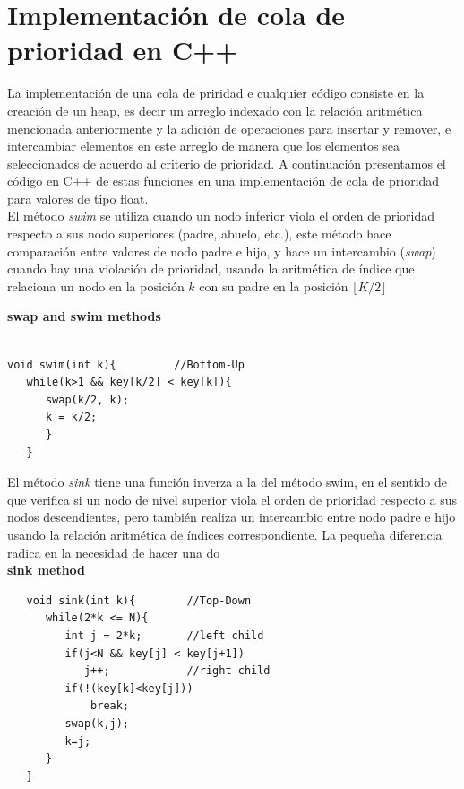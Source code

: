 \documentclass[letterpaper]{article}
\begin{document}
\section{Implementación de cola de prioridad en C++}

La implementación de una cola de priridad e cualquier código consiste en la creación de un heap, es decir un arreglo indexado con la relación aritmética mencionada anteriormente y la adición de operaciones para insertar y remover, e intercambiar elementos en este arreglo de manera que los elementos sea seleccionados de acuerdo al criterio de prioridad. A continuación presentamos el código en C++ de estas funciones en una implementación de cola de prioridad para valores de tipo float.\\

El método \textit{swim} se utiliza cuando un nodo inferior viola el orden de prioridad respecto a sus nodo superiores (padre, abuelo, etc.), este método hace comparación entre valores de nodo padre e hijo, y hace un intercambio (\textit{swap}) cuando hay una violación de prioridad, usando la aritmética de índice que relaciona un nodo en la posición $k$ con su padre en la posición $\lfloor K/2\rfloor$

{\large\textbf{swap and swim methods}}

\begin{lstlisting}
   
void swim(int k){	      //Bottom-Up
   while(k>1 && key[k/2] < key[k]){
      swap(k/2, k);
      k = k/2;
      }
   }
\end{lstlisting}

El método \textit{sink} tiene una función inverza a la del método swim, en el sentido de que verifica si un nodo de nivel superior viola el orden de prioridad respecto a sus nodos descendientes, pero también realiza un intercambio entre nodo padre e hijo usando la relación aritmética de índices correspondiente. La pequeña diferencia radica en la necesidad de hacer una do\\

{\large\textbf{sink method}}

\begin{lstlisting}
   void sink(int k){        //Top-Down
      while(2*k <= N){
         int j = 2*k;       //left child
         if(j<N && key[j] < key[j+1])
            j++;            //right child
         if(!(key[k]<key[j]))
             break;
         swap(k,j);
         k=j;
      }
   }
\end{lstlisting}	
\end{document}
